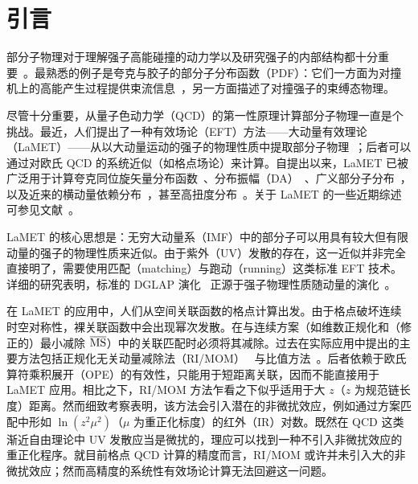 \section{引言}
\label{sec:intro}

部分子物理对于理解强子高能碰撞的动力学以及研究强子的内部结构都十分重要~\cite{Ellis:1991qj,Thomas:2001kw}。最熟悉的例子是夸克与胶子的部分子分布函数（PDF）：它们一方面为对撞机上的高能产生过程提供束流信息~\cite{Gao:2017yyd}，另一方面描述了对撞强子的束缚态物理。

尽管十分重要，从量子色动力学（QCD）的第一性原理计算部分子物理一直是个挑战。最近，人们提出了一种有效场论（EFT）方法——大动量有效理论（LaMET）——从以大动量运动的强子的物理性质中提取部分子物理~\cite{Ji:2013dva,Ji:2014gla}；后者可以通过对欧氏 QCD 的系统近似（如格点场论）来计算。自提出以来，LaMET 已被广泛用于计算夸克同位旋矢量分布函数~\cite{Lin:2014zya,Alexandrou:2015rja,Chen:2016utp,Alexandrou:2016jqi,Alexandrou:2018pbm,Chen:2018xof,Lin:2018qky,Liu:2018uuj,Alexandrou:2018eet,Liu:2018hxv,Chen:2018fwa,Izubuchi:2019lyk,Shugert:2020tgq,Chai:2020nxw,Lin:2020ssv,Fan:2020nzz}、分布振幅（DA）~\cite{Zhang:2017bzy,Chen:2017gck,Zhang:2020gaj}、广义部分子分布~\cite{Chen:2019lcm,Alexandrou:2019dax}，以及近来的横动量依赖分布~\cite{Shanahan:2019zcq,Shanahan:2020zxr,Zhang:2020dbb}，甚至高扭度分布~\cite{Bhattacharya:2020cen}。关于 LaMET 的一些近期综述可参见文献~\cite{Ji:2020ect,Cichy:2018mum}。

LaMET 的核心思想是：无穷大动量系（IMF）中的部分子可以用具有较大但有限动量的强子的物理性质来近似。由于紫外（UV）发散的存在，这一近似并非完全直接明了，需要使用匹配（matching）与跑动（running）这类标准 EFT 技术。详细的研究表明，标准的 DGLAP 演化~\cite{Dokshitzer:1977sg,Gribov:1972ri,Altarelli:1977zs} 正源于强子物理性质随动量的演化~\cite{Ji:2020ect}。

在 LaMET 的应用中，人们从空间关联函数的格点计算出发。由于格点破坏连续时空对称性，裸关联函数中会出现幂次发散。在与连续方案（如维数正规化和（修正的）最小减除 ${\overline {\rm MS}}$）中的关联匹配时必须将其减除。过去在实际应用中提出的主要方法包括正规化无关动量减除法（RI/MOM）~\cite{Constantinou:2017sej,Stewart:2017tvs,Alexandrou:2017huk,Chen:2017mzz} 与比值方法~\cite{Radyushkin:2017cyf,Orginos:2017kos,Braun:2018brg,Li:2020xml}。后者依赖于欧氏算符乘积展开（OPE）的有效性，只能用于短距离关联，因而不能直接用于 LaMET 应用。相比之下，RI/MOM 方法乍看之下似乎适用于大 $z$（$z$ 为规范链长度）距离。然而细致考察表明，该方法会引入潜在的非微扰效应，例如通过方案匹配中形如 $\ln(z^2\mu^2)$（$\mu$ 为重正化标度）的红外（IR）对数。既然在 QCD 这类渐近自由理论中 UV 发散应当是微扰的，理应可以找到一种不引入非微扰效应的重正化程序。就目前格点 QCD 计算的精度而言，RI/MOM 或许并未引入大的非微扰效应；然而高精度的系统性有效场论计算无法回避这一问题。

